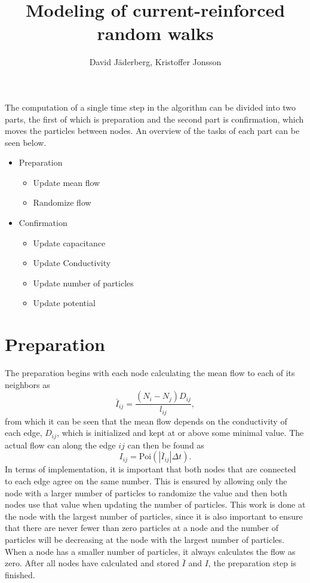 \documentclass{article}
\begin{document}
\title{Modeling of current-reinforced random walks}
\author{David J\"{a}derberg, Kristoffer Jonsson}
\maketitle

The computation of a single time step in the algorithm can be divided into two parts, the first of which is preparation and the second part is confirmation, which moves the particles between nodes. An overview of the tasks of each part can be seen below.

\begin{itemize}
\item Preparation
	\begin{itemize}
		\item Update mean flow
		\item Randomize flow
	\end{itemize}
\item Confirmation
	\begin{itemize}
		\item Update capacitance
		\item Update Conductivity
		\item Update number of particles
		\item Update potential
	\end{itemize}
\end{itemize}

\section{Preparation}
The preparation begins with each node calculating the mean flow to each of its neighbors as
\begin{equation}
\bar{I}_{ij} = \frac{(N_i - N_j)D_{ij}}{l_{ij}},
\end{equation}
from which it can be seen that the mean flow depends on the conductivity of each edge, $D_{ij}$, which is initialized and kept at or above some minimal value.
The actual flow can along the edge $ij$ can then be found as
\begin{equation}
I_{ij} = \text{Poi}(|\bar{I}_{ij}|\Delta t).
\end{equation}
In terms of implementation, it is important that both nodes that are connected to each edge agree on the same number. This is ensured by allowing only the node with a larger number of particles to randomize the value and then both nodes use that value when updating the number of particles. This work is done at the node with the largest number of particles, since it is also important to ensure that there are never fewer than zero particles at a node and the number of particles will be decreasing at the node with the largest number of particles. When a node has a smaller number of particles, it always calculates the flow as zero. After all nodes have calculated and stored $\bar{I}$ and $I$, the preparation step is finished.
\end{document}
